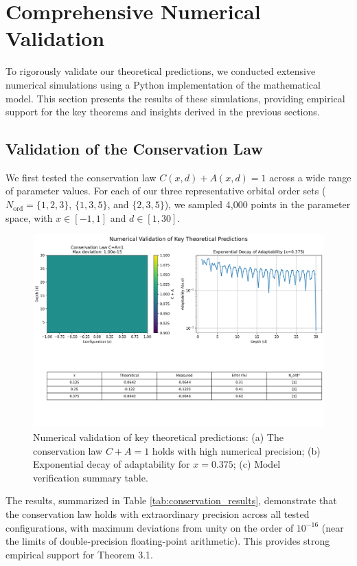\documentclass[11pt,a4paper]{article}
\begin{document}
\section{Comprehensive Numerical Validation}

To rigorously validate our theoretical predictions, we conducted extensive numerical simulations using a Python implementation of the mathematical model. This section presents the results of these simulations, providing empirical support for the key theorems and insights derived in the previous sections.

\subsection{Validation of the Conservation Law}

We first tested the conservation law $C(x,d) + A(x,d) = 1$ across a wide range of parameter values. For each of our three representative orbital order sets ($N_{\text{ord}} = \{1,2,3\}$, $\{1,3,5\}$, and $\{2,3,5\}$), we sampled 4,000 points in the parameter space, with $x \in [-1,1]$ and $d \in [1,30]$.

\begin{figure}[H]
    \centering
    \includegraphics[width=\textwidth]{figures/conservation_law_verification.png}
    \caption{Numerical validation of key theoretical predictions: (a) The conservation law $C+A=1$ holds with high numerical precision; (b) Exponential decay of adaptability for $x=0.375$; (c) Model verification summary table.}
    \label{fig:numerical_validation}
\end{figure}

The results, summarized in Table \ref{tab:conservation_results}, demonstrate that the conservation law holds with extraordinary precision across all tested configurations, with maximum deviations from unity on the order of $10^{-16}$ (near the limits of double-precision floating-point arithmetic). This provides strong empirical support for Theorem 3.1.
\end{document}

